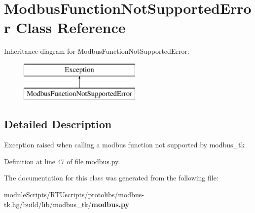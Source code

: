 \section{Modbus\+Function\+Not\+Supported\+Error Class Reference}
\label{classmodbus__tk_1_1modbus_1_1_modbus_function_not_supported_error}
Inheritance diagram for Modbus\+Function\+Not\+Supported\+Error\+:\begin{figure}[H]
\begin{center}
\leavevmode
\includegraphics[height=2.000000cm]{classmodbus__tk_1_1modbus_1_1_modbus_function_not_supported_error}
\end{center}
\end{figure}


\subsection{Detailed Description}
\begin{DoxyVerb}Exception raised when calling a modbus function not supported by modbus_tk
\end{DoxyVerb}
 

Definition at line 47 of file modbus.\+py.



The documentation for this class was generated from the following file\+:\begin{DoxyCompactItemize}
\item 
module\+Scripts/\+R\+T\+Uscripts/protolibs/modbus-\/tk.\+hg/build/lib/modbus\+\_\+tk/{\bf modbus.\+py}\end{DoxyCompactItemize}
